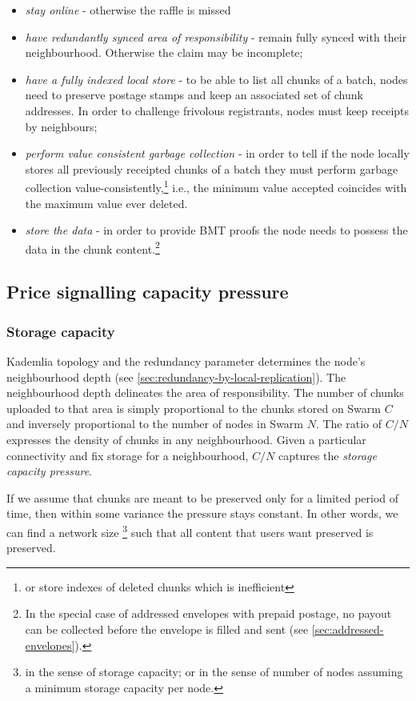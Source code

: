 \begin{itemize}
\item  \emph{stay online} - otherwise the raffle is missed
\item \emph{have redundantly synced area of responsibility} - remain fully synced with their neighbourhood. Otherwise the claim may be incomplete;
\item \emph{have a fully indexed local store} - to be able to list all chunks of a batch, nodes need to preserve postage stamps and keep an associated set of chunk addresses. In order to challenge frivolous registrants, nodes must keep receipts by neighbours;
\item \emph{perform value consistent garbage collection} - in order to tell if the node locally stores all previously receipted chunks of a batch they must perform garbage collection value-consistently,\footnote{or store indexes of deleted chunks which is inefficient}
i.e., the minimum value accepted coincides with the maximum value ever deleted.
\item \emph{store the data} - in order to provide BMT proofs the node needs to possess the data in the chunk content.\footnote{In the special case of addressed envelopes with prepaid postage, no payout can be collected before the envelope is filled and sent (see \ref{sec:addressed-envelopes}).}
\end{itemize}



\subsection{Price signalling capacity pressure}\label{sec:capacity-pressure}

\subsubsection{Storage capacity}
Kademlia topology and the redundancy parameter determines the node's neighbourhood depth (see \ref{sec:redundancy-by-local-replication}). The neighbourhood depth delineates the area of responsibility. The number of chunks uploaded to that area is simply proportional to the chunks stored on Swarm $C$ and inversely proportional to the number of nodes in Swarm $N$. The ratio of $C/N$ expresses the density of chunks in any neighbourhood. Given a particular connectivity and fix storage for a neighbourhood, $C/N$ captures the \emph{storage capacity pressure}. 

If we assume that chunks are meant to be preserved only for a limited period of time, then within some variance the pressure stays constant. In other words, we can find a network size%
%
\footnote{in the sense of storage capacity; or in the sense of number of nodes assuming a minimum storage capacity per node.}
%
such that all content that users want preserved is preserved. 

